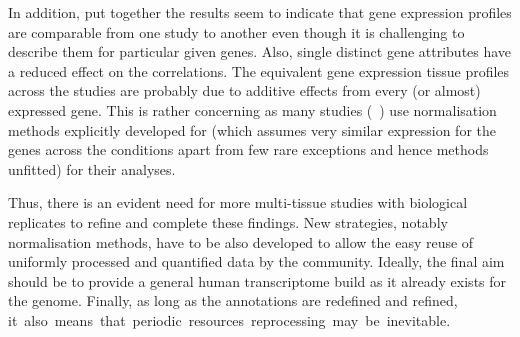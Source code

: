 In addition,
put together the results seem to indicate that
gene expression profiles are comparable from one study to another even though
it is challenging to describe them for particular given genes.
Also, single distinct gene attributes have a reduced effect on the correlations.
The equivalent gene expression tissue profiles across the studies
are probably due to additive effects from every (or almost) expressed gene.
This is rather concerning as many studies (\eg{}~\cite{Sudmant2015-zt})
use normalisation methods explicitly developed for 
(which assumes very similar expression for the genes across the conditions apart
from few rare exceptions and hence methods unfitted) for their analyses.

\vspace{-1.1mm}
Thus, there is an evident need for more multi-tissue studies
with biological replicates to refine and complete these findings.
New strategies, notably normalisation methods, have to be also developed
to allow the easy reuse of uniformly processed and quantified data by
the community.
Ideally, the final aim should be to provide a general human transcriptome build
as it already exists for the genome.
Finally, as long as the annotations are redefined and refined,
it~also~means~that~periodic~resources~reprocessing~may~be~inevitable.

